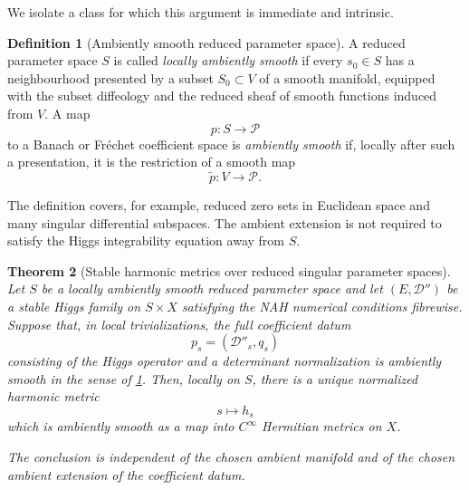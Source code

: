 \documentclass[11pt,reqno]{amsart}
\newtheorem{theorem}{Theorem}[section]
\theoremstyle{definition}
\newtheorem{definition}[theorem]{Definition}
\theoremstyle{remark}
\newcommand{\cD}{\mathcal D}
\newcommand{\cP}{\mathcal P}
\begin{document}
We isolate a class for which this argument is immediate and intrinsic.

\begin{definition}[Ambiently smooth reduced parameter space]\label{def:ambient-reduced-space}
A reduced parameter space $S$ is called \emph{locally ambiently smooth} if every $s_0\in S$ has a neighbourhood presented by a subset $S_0\subset V$ of a smooth manifold, equipped with the subset diffeology and the reduced sheaf of smooth functions induced from $V$.  A map
\[
  p:S\longrightarrow\cP
\]
to a Banach or Fr\'echet coefficient space is \emph{ambiently smooth} if, locally after such a presentation, it is the restriction of a smooth map
\[
  \widetilde p:V\longrightarrow\cP.
\]
\end{definition}

The definition covers, for example, reduced zero sets in Euclidean space and many singular differential subspaces.  The ambient extension is not required to satisfy the Higgs integrability equation away from $S$.

\begin{theorem}[Stable harmonic metrics over reduced singular parameter spaces]\label{thm:ambient-singular-stable}
Let $S$ be a locally ambiently smooth reduced parameter space and let $(E,\cD'')$ be a stable Higgs family on $S\times X$ satisfying the NAH numerical conditions fibrewise.  Suppose that, in local trivializations, the full coefficient datum
\[
  p_s=(\cD''_s,q_s)
\]
consisting of the Higgs operator and a determinant normalization is ambiently smooth in the sense of \cref{def:ambient-reduced-space}.  Then, locally on $S$, there is a unique normalized harmonic metric
\[
  s\longmapsto h_s
\]
which is ambiently smooth as a map into $C^\infty$ Hermitian metrics on $X$.

The conclusion is independent of the chosen ambient manifold and of the chosen ambient extension of the coefficient datum.
\end{theorem}
\end{document}
